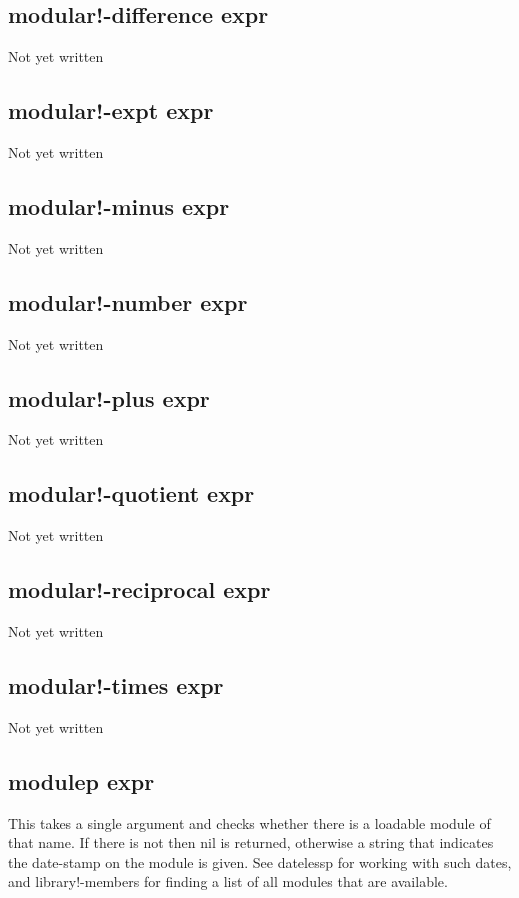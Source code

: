 \documentclass[a4paper,11pt]{article}
\begin{document}
{\subsection{\ttfamily modular!-difference expr}
Not yet written

\subsection{\ttfamily modular!-expt expr}
Not yet written

\subsection{\ttfamily modular!-minus expr}
Not yet written

\subsection{\ttfamily modular!-number expr}
Not yet written

\subsection{\ttfamily modular!-plus expr}
Not yet written

\subsection{\ttfamily modular!-quotient expr}
Not yet written

\subsection{\ttfamily modular!-reciprocal expr}
Not yet written

\subsection{\ttfamily modular!-times expr}
Not yet written

\subsection{\ttfamily modulep expr}
This takes a single argument and checks whether there is a loadable module
of that name. If there is not then {\ttfamily nil} is returned, otherwise a
string that indicates the date-stamp on the module is given. See
{\ttfamily datelessp} for working with such dates, and {\ttfamily
library!-members} for finding a list of all modules that are available.
  

}
\end{document}
